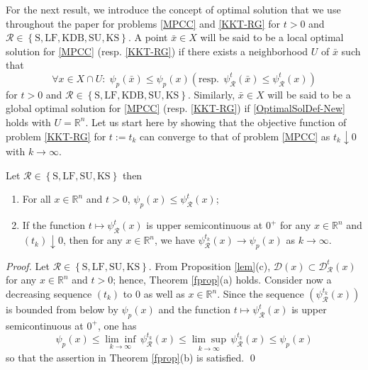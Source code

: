 For the next result, we introduce the concept of optimal solution that we use throughout the paper for problems \eqref{MPCC} and \eqref{KKT-RG} for $t>0$ and $\mathcal{R}\in \left\{\mbox{S}, \mbox{LF}, \mbox{KDB}, \mbox{SU}, \mbox{KS}\right\}$. 
A point $\bar{x}\in X$ will be said to be a local optimal solution for \eqref{MPCC}
(resp. \eqref{KKT-RG}) if there exists a neighborhood $U$ of $\bar{x}$ such that 
\begin{equation}\label{OptimalSolDef-New}
\forall x\in X\cap U: \;\psi_{p}(\bar{x})\leq\psi_{p}(x) \left(\mbox{resp.}\;\,\psi_{\mathcal{R}}^{t}(\bar{x})\leq\psi_{\mathcal{R}}^{t}(x)\right)
\end{equation}
for $t>0$ and $\mathcal{R}\in \left\{\mbox{S}, \mbox{LF}, \mbox{KDB}, \mbox{SU}, \mbox{KS}\right\}$. 
Similarly, $\bar{x}\in X$ will be said to be a global optimal solution for \eqref{MPCC}
(resp. \eqref{KKT-RG})  if \eqref{OptimalSolDef-New} holds with $U=\mathbb{R}^n$.
Let us start here by showing that the objective function of problem \eqref{KKT-RG} for $t:=t_k$ can converge to that of problem \eqref{MPCC} as $t_k\downarrow 0$ with $k\rightarrow\infty$.
  {
\begin{theorem} \label{fprop}
Let $\mathcal{R}\in \left\{\mbox{S}, \mbox{LF}, \mbox{SU}, \mbox{KS}\right\}$ then 
\begin{enumerate}
\item[$(a)$]  For all $x\in \mathbb{R}^n$ and $t>0$, $\psi_p(x) \leq \psi^t_{\mathcal{R}}(x)$;
\item[$(b)$] If the function  $t\mapsto\psi_{\mathcal{R}}^{t}(x)$ is  upper semicontinuous at $0^+$ for any $x\in \mathbb{R}^n$ and
	 $(t_{k})\downarrow0$, then for any $x\in\mathbb{R}^{n}$, we have
	$\psi_{\mathcal{R}}^{t_{k}}(x)\rightarrow\psi_{p}(x)$ as $k\rightarrow\infty$.
\end{enumerate}
\end{theorem}
\begin{proof}
Let $\mathcal{R}\in \left\{\mbox{S}, \mbox{LF},  \mbox{SU}, \mbox{KS}\right\}$. From Proposition \ref{lem}(c), $\mathcal{D}(x) \subset\mathcal{D}^{t}_{\mathcal{R}}(x)$ for any $x\in\mathbb{R}^{n}$ and $t>0$; hence, Theorem \ref{fprop}(a) holds. %
Consider now a decreasing sequence $(t_{k})$ to $0$  as well as $x\in\mathbb{R}^{n}$.
Since the sequence $(\psi_\mathcal{R}^{t_{k}}(x))$ is bounded from below by
$\psi_{p}(x)$ and the function $t\mapsto\psi_{\mathcal{R}}^{t}(x)$ is  upper semicontinuous at $0^+$, one has 
\begin{equation*}
\psi_{p}(x)\leq\underset{k\rightarrow\infty}{\lim \inf}\,\psi_\mathcal{R}^{t_{k}}(x)\leq \underset{k\rightarrow\infty}{\lim \sup}\,\psi_\mathcal{R}^{t_{k}}(x)\leq\psi_{p}(x) 
\end{equation*}
so that the assertion in Theorem \ref{fprop}(b) is satisfied. \hfill \qed 
\end{proof}}

